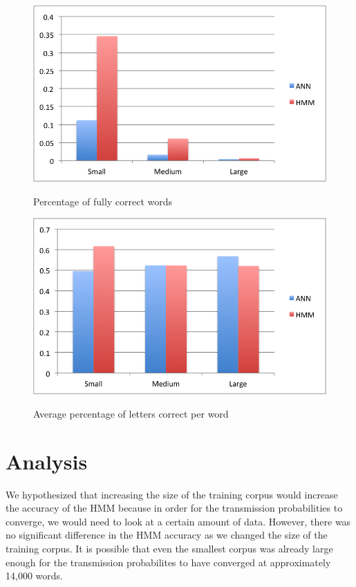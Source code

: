 \documentclass[11pt,letterpaper]{article}
\begin{document}
\begin{figure}[h]
\centering
\caption{Percentage of fully correct words}
\includegraphics[scale=0.55]{img/wordsCorrect.png}
\label{fig:wordsCorrect}
\end{figure}

\begin{figure}[h]
\centering
\caption{Average percentage of letters correct per word}
\includegraphics[scale=0.55]{img/wordCorrectness.png}
\label{fig:lettersCorrectPerWord}
\end{figure}

\section{Analysis}

We hypothesized that increasing the size of the training corpus would increase the accuracy of the
HMM because in order for the transmission probabilities to converge, we would need to look at a
certain amount of data. However, there was no significant difference in the HMM accuracy as we
changed the size of the training corpus. It is possible that even the smallest corpus was already
large enough for the transmission probabilites to have converged at approximately 14,000 words.
\end{document}
